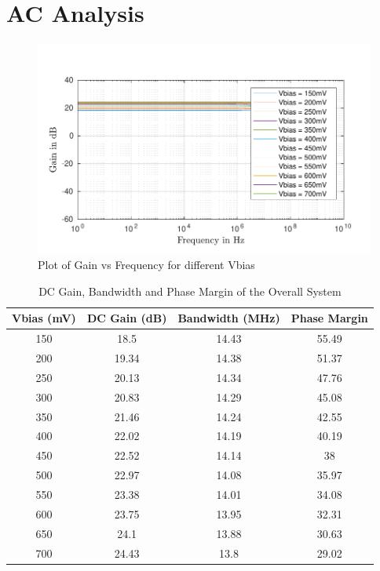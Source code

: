 \section{AC Analysis}

\begin{figure} [H]
\centering
\includegraphics[scale=1]{Figures/Plots/Ov_Gain.pdf}
\caption{Plot of Gain vs Frequency for different Vbias}
\end{figure}

\begin{table} [H]
\centering
\begin{tabular}{@{}cccc@{}}
\toprule
Vbias (mV)			& DC Gain (dB) 	& Bandwidth (MHz) 	& Phase Margin \\ \midrule
150					& 18.5  		& 14.43 			& 55.49 \\
200					& 19.34			& 14.38 			& 51.37 \\
250					& 20.13  		& 14.34 			& 47.76 \\
300					& 20.83	 		& 14.29 			& 45.08 \\
350					& 21.46			& 14.24 			& 42.55 \\
400					& 22.02	 		& 14.19 			& 40.19 \\
450					& 22.52 		& 14.14 			& 38	\\
500					& 22.97 		& 14.08 			& 35.97	\\
550					& 23.38 		& 14.01 			& 34.08 \\
600					& 23.75 		& 13.95 			& 32.31 \\
650					& 24.1 			& 13.88 			& 30.63 \\
700 				& 24.43 		& 13.8  			& 29.02 \\
\bottomrule
\end{tabular}
\caption{DC Gain, Bandwidth and Phase Margin of the Overall System}
\end{table}

